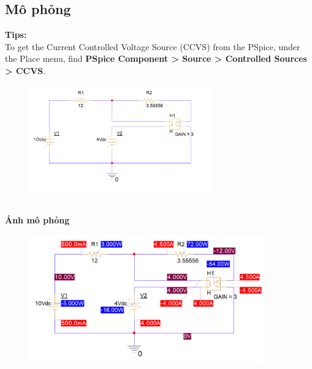 \subsection{Mô phỏng}
\textbf{Tips:}\\
To get the Current Controlled Voltage Source (CCVS) from the PSpice, under the Place
menu, find \textbf{PSpice Component > Source > Controlled Sources > CCVS}.\\
\begin{figure}[!htbp]
    \centering
    \includegraphics[width=0.7\textwidth]{graphics/ex9/f4.png}
    \end{figure}\\
    \textbf{Ảnh mô phỏng}
\begin{figure}[!htbp]
        \centering
        \includegraphics[width=0.9\textwidth]{graphics/ex9/f5.png}
        \end{figure}


